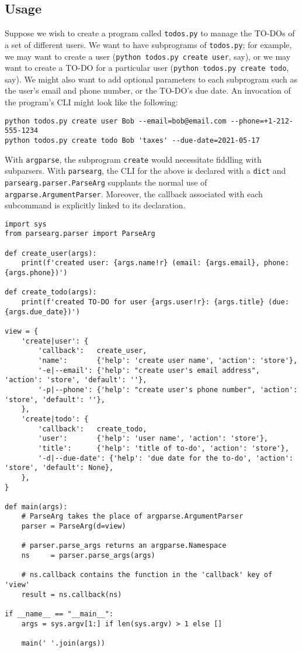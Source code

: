\documentclass[10pt]{amsart}
\numberwithin{equation}{section}
\begin{document}
\subsection{Usage}
\label{sec:orge4f1139}
Suppose we wish to create a program called \texttt{todos.py} to manage the TO-DOs
of a set of different users. We want to have subprograms of \texttt{todos.py}; for
example, we may want to create a user (\texttt{python todos.py create user}, say),
or we may want to create a TO-DO for a particular user 
(\texttt{python todos.py create todo}, say).  
We might also want to add optional parameters to each subprogram such as
the user's email and phone number, or the TO-DO's due date. An invocation
of the program's CLI might look like the following:
\begin{verbatim}
python todos.py create user Bob --email=bob@email.com --phone=+1-212-555-1234
python todos.py create todo Bob 'taxes' --due-date=2021-05-17
\end{verbatim}
With \texttt{argparse}, the subprogram \texttt{create} would necessitate fiddling
with subparsers.  With \texttt{parsearg}, the CLI for the above is declared
with a \texttt{dict} and \texttt{parsearg.parser.ParseArg} supplants the normal use of
\texttt{argparse.ArgumentParser}. Moreover, the callback associated with
each subcommand is explicitly linked to its declaration.
\begin{verbatim}
import sys
from parsearg.parser import ParseArg

def create_user(args):
    print(f'created user: {args.name!r} (email: {args.email}, phone: {args.phone})')

def create_todo(args):
    print(f'created TO-DO for user {args.user!r}: {args.title} (due: {args.due_date})')

view = {
    'create|user': {
        'callback':   create_user,
        'name':       {'help': 'create user name', 'action': 'store'},
        '-e|--email': {'help': "create user's email address", 'action': 'store', 'default': ''},
        '-p|--phone': {'help': "create user's phone number", 'action': 'store', 'default': ''},
    },
    'create|todo': {
        'callback':   create_todo,
        'user':       {'help': 'user name', 'action': 'store'},
        'title':      {'help': 'title of to-do', 'action': 'store'},
        '-d|--due-date': {'help': 'due date for the to-do', 'action': 'store', 'default': None},
    },
}

def main(args):
    # ParseArg takes the place of argparse.ArgumentParser
    parser = ParseArg(d=view)

    # parser.parse_args returns an argparse.Namespace
    ns     = parser.parse_args(args)

    # ns.callback contains the function in the 'callback' key of 'view'
    result = ns.callback(ns)

if __name__ == "__main__":
    args = sys.argv[1:] if len(sys.argv) > 1 else []

    main(' '.join(args))
\end{verbatim}
\end{document}
